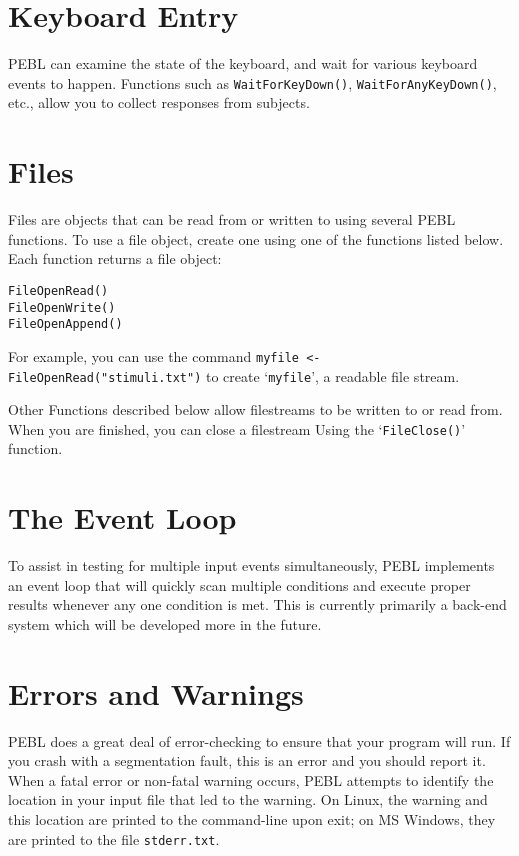 \section{Keyboard Entry}

PEBL can examine the state of the keyboard, and wait for various keyboard events to happen. Functions such as \texttt{WaitForKeyDown()}, \texttt{WaitForAnyKeyDown()}, etc., allow you to collect responses from subjects.


\section{Files}

Files are objects that can be read from or written to using several PEBL functions. To use a file object, create one using one of the functions 
listed below.  Each function returns a file object:
\begin{verbatim}
FileOpenRead()
FileOpenWrite()
FileOpenAppend()
\end{verbatim}

For example, you can use the command \texttt{myfile <- FileOpenRead("stimuli.txt")} to create `\texttt{myfile}', a readable file stream.

Other Functions described below allow filestreams to be written to 
or read from.  When you are finished, you can close a filestream 
Using the `\texttt{FileClose()}' function.


\section{The Event Loop}

To assist in testing for multiple input events simultaneously, 
PEBL implements an event loop that will quickly scan multiple conditions
and execute proper results whenever any one condition is met.  
This is currently primarily a back-end system 
which will be developed more in the future.


\section{Errors and Warnings}

PEBL does a great deal of error-checking to ensure that your program
will run.  If you crash with a segmentation fault, this is an error
and you should report it.  When a fatal error or non-fatal warning occurs, PEBL attempts to identify the location in your input file that led to 
the warning.  On Linux, the warning and this location are printed to the command-line upon exit; on MS Windows, they are printed to the file \texttt{stderr.txt}.


